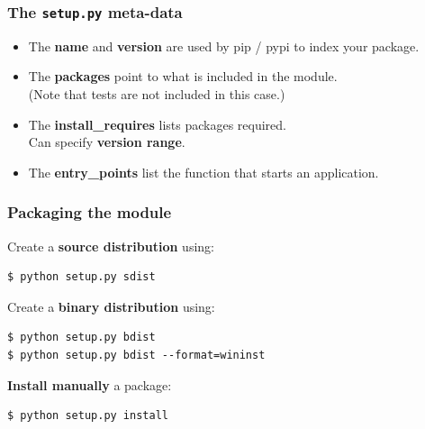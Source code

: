 \documentclass{beamer} %
\newcommand\emc[1]{\textcolor{brightblue}{\textbf{#1}}}
\begin{document}


\begin{frame}

\frametitle{The \texttt{setup.py} meta-data}

\begin{itemize}
  \item The \emc{name} and \emc{version} are used by pip / pypi to index your package.
  \item The \emc{packages} point to what is included in the module. \\ (Note that tests are not included in this case.)
  \item The \emc{install\_requires} lists packages required. \\ Can specify \emc{version range}. 
  \item The \emc{entry\_points} list the function that starts an application.
  \end{itemize}

\end{frame}

\begin{frame}[fragile]

\frametitle{Packaging the module}

Create a \emc{source distribution} using:
\begin{verbatim}
$ python setup.py sdist
\end{verbatim}

\vspace{3mm}
Create a \emc{binary distribution} using:
\begin{verbatim}
$ python setup.py bdist
$ python setup.py bdist --format=wininst
\end{verbatim}

\vspace{3mm}
\emc{Install manually} a package:
\begin{verbatim}
$ python setup.py install
\end{verbatim}

\end{frame}
\end{document}
